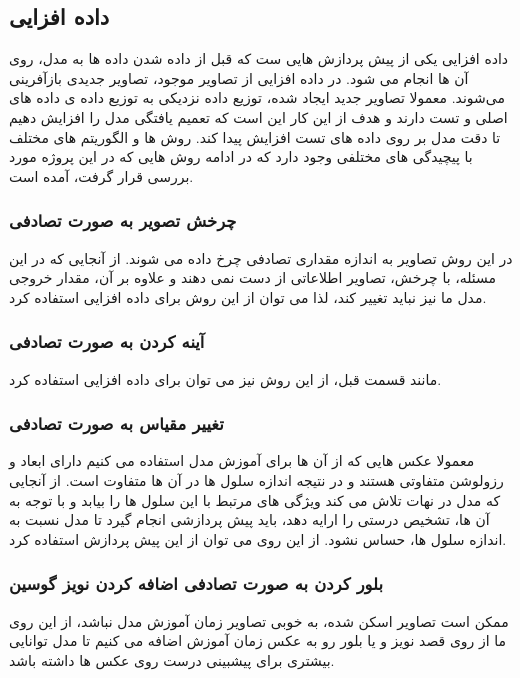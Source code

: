 \subsection{داده افزایی}\label{subsec:داده-افزایی}

داده افزایی یکی از پیش پردازش هایی ست که قبل از داده شدن داده ها به مدل، روی آن ها انجام می شود.
در داده افزایی از تصاویر موجود، تصاویر جدیدی بازآفرینی می‌شوند.
معمولا تصاویر جدید ایجاد شده، توزیع داده نزدیکی به توزیع داده ی داده های اصلی و تست دارند و هدف از این کار این است که تعمیم یافتگی مدل را افزایش دهیم تا دقت مدل بر روی داده های تست افزایش پیدا کند.
روش ها و الگوریتم های مختلف با پیچیدگی های مختلفی وجود دارد که در ادامه روش هایی که در این پروژه مورد بررسی قرار گرفت، آمده است.
\subsubsection{چرخش تصویر به صورت تصادفی}
در این روش تصاویر به اندازه مقداری تصادفی چرخ داده می شوند.
از آنجایی که در این مسئله، با چرخش، تصاویر اطلاعاتی از دست نمی دهند و علاوه بر آن، مقدار خروجی مدل ما نیز نباید تغییر کند، لذا می توان از این روش برای داده افزایی استفاده کرد.

\subsubsection{آینه کردن به صورت تصادفی}
مانند قسمت قبل، از این روش نیز می توان برای داده افزایی استفاده کرد.

\subsubsection{تغییر مقیاس به صورت تصادفی}
معمولا عکس هایی که از آن ها برای آموزش مدل استفاده می کنیم دارای ابعاد و رزولوشن متفاوتی هستند و در نتیجه اندازه سلول ها در آن ها متفاوت است.
از آنجایی که مدل در نهات تلاش می کند ویژگی های مرتبط با این سلول ها را بیابد و با توجه به آن ها، تشخیص درستی را ارایه دهد، باید پیش پردازشی انجام گیرد تا مدل نسبت به اندازه سلول ها، حساس نشود.
از این روی می توان از این پیش پردازش استفاده کرد.

\subsubsection{بلور کردن به صورت تصادفی اضافه کردن نویز گوسین }
ممکن است تصاویر اسکن شده، به خوبی تصاویر زمان آموزش مدل نباشد، از این روی ما از روی قصد نویز و یا بلور رو به عکس زمان آموزش اضافه می کنیم تا مدل توانایی بیشتری برای پیشبینی درست روی عکس ها داشته باشد.

